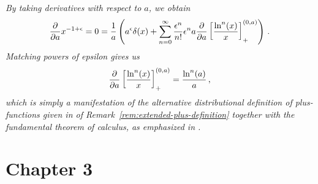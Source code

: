\begin{remarkbox*}{}{}
\textit{
    By taking derivatives with respect to \(a\), we obtain
    \begin{align}
        \frac{\partial}{\partial a}
        x^{-1 + \epsilon}
        =
        0
        =
        \frac{1}{a}
        \left(
            a^\epsilon \delta(x)
            +
            \sum_{n=0}^\infty
            \frac{\epsilon^n}{n!}
            \epsilon^n
            a
            \frac{\partial}{\partial a}
            \left[\frac{\ln^n(x)}{x}\right]_+^{(0,a)}
        \right)
        \,.
    \end{align}
    Matching powers of epsilon gives us
    \begin{align}
        \frac{\partial}{\partial a}
        \left[\frac{\ln^n(x)}{x}\right]_+^{(0,a)}
        =
        \frac{\ln^n(a)}{a}
        \,,
    \end{align}
    which is simply a manifestation of the alternative distributional definition of plus-functions given in  of Remark~\ref{rem:extended-plus-definition} together with the fundamental theorem of calculus, as emphasized in .
}
\end{remarkbox*}




\section*{Chapter 3}













